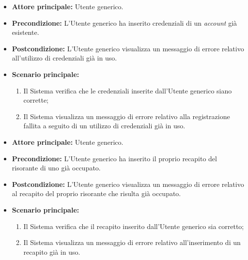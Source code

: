 \label{usecase:Errore registrazione account esistente}
\begin{itemize}

	\item \textbf{Attore principale:} Utente generico.

	\item \textbf{Precondizione:} L'Utente generico ha inserito credenziali di un \textit{account} già esistente.

	\item \textbf{Postcondizione:} L'Utente generico visualizza un messaggio di errore relativo all'utilizzo di credenziali già in uso.

	\item \textbf{Scenario principale:}
	\begin{enumerate}
        \item Il Sistema verifica che le credenziali inserite dall'Utente generico siano corrette;
        \item Il Sistema visualizza un messaggio di errore relativo alla registrazione fallita a seguito di un utilizzo di credenziali già in uso.
	\end{enumerate}
	
\end{itemize}

\label{usecase:Errore registrazione recapito occupato}
\begin{itemize}

	\item \textbf{Attore principale:} Utente generico.

	\item \textbf{Precondizione:} L'Utente generico ha inserito il proprio recapito del risorante di uno già occupato.
	
	\item \textbf{Postcondizione:} L'Utente generico visualizza un messaggio di errore relativo al recapito del proprio risorante che risulta già occupato.

	\item \textbf{Scenario principale:}
	\begin{enumerate}
        \item Il Sistema verifica che il recapito inserito dall'Utente generico sia corretto;
        \item Il Sistema visualizza un messaggio di errore relativo all'inserimento di un recapito già in uso.
	\end{enumerate}
	
\end{itemize}